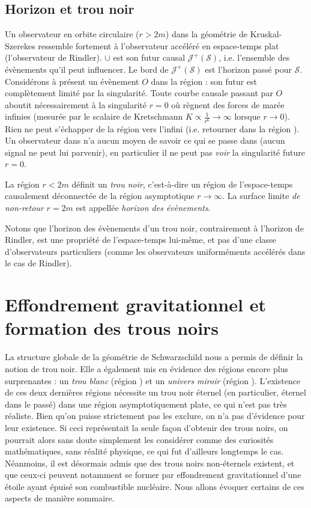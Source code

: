 \subsection{Horizon et trou noir}
Un observateur en orbite circulaire ($r>2m$) dans la géométrie de Kruskal-Szerekes ressemble fortement à l'observateur accéléré en espace-temps plat (l'observateur de Rindler).  $\cup$  est son futur causal $\mathcal{J}^+(\mathcal{S})$, i.e. l'ensemble des évènements qu'il peut influencer. Le bord de $\mathcal{J}^+(\mathcal{S})$ est l'horizon passé pour $\mathcal{S}$. \\
Considérons à présent un évènement $O$ dans la région  : son futur est complètement limité par la singularité. Toute courbe causale passant par $O$ aboutit nécessairement à la singularité $r=0$ où règnent des forces de marée infinies (mesurée par le scalaire de Kretschmann $K \propto \frac{1}{r^6} \to \infty$ lorsque $r\to 0$). Rien ne peut s'échapper de la région  vers l'infini (i.e. retourner dans la région ). Un observateur dans  n'a aucun moyen de savoir ce qui se passe dans  (aucun signal ne peut lui parvenir), en particulier il ne peut pas \emph{voir} la singularité future $r=0$. 
\begin{theoremframe}
    \begin{defi}
        La région $r<2m$ définit un \emph{trou noir}, c'est-à-dire un région de l'espace-temps causalement déconnectée de la région asymptotique $r \to \infty$. La surface limite \emph{de non-retour} $r=2m$ est appellée \emph{horizon des évènements}.
    \end{defi}
\end{theoremframe}
Notons que l'horizon des évènements d'un trou noir, contrairement à l'horizon de Rindler, est une propriété de l'espace-temps lui-même, et pas d'une classe d'observateurs particuliers (comme les observateurs uniforméments accélérés dans le cas de Rindler).
\section{Effondrement gravitationnel et formation des trous noirs}
La structure globale de la géométrie de Schwarzschild nous a permis de définir la notion de trou noir. Elle a également mis en évidence des régions encore plus surprenantes : un \emph{trou blanc} (région ) et un \emph{univers miroir} (région ). L'existence de ces deux dernières régions nécessite un trou noir éternel (en particulier, éternel dans le passé) dans une région asymptotiquement plate, ce qui n'est pas très réaliste. Bien qu'on puisse strictement pas les exclure, on n'a pas d'évidence pour leur existence. Si ceci représentait la seule façon d'obtenir des trous noirs, on pourrait alors sans doute simplement les considérer comme des curiosités mathématiques, sans réalité physique, ce qui fut d'ailleurs longtemps le cas. Néanmoins, il est désormais admis que des trous noirs non-éternels existent, et que ceux-ci peuvent notamment se former par effondrement gravitationnel d'une étoile ayant épuisé son combustible nucléaire. Nous allons évoquer certains de ces aspects de manière sommaire.
